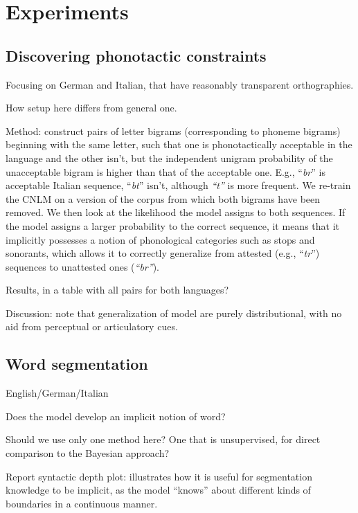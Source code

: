 \section{Experiments}
\label{sec:experiments}

\subsection{Discovering phonotactic constraints}
\label{sec:phonotactics}

Focusing on German and Italian, that have reasonably transparent
orthographies.

How setup here differs from general one.

Method: construct pairs of letter bigrams (corresponding to phoneme
bigrams) beginning with the same letter, such that one is
phonotactically acceptable in the language and the other isn't, but
the independent unigram probability of the unacceptable bigram is
higher than that of the acceptable one. E.g., ``\emph{br}'' is
acceptable Italian sequence, ``\emph{bt}'' isn't, although
\emph{``t''} is more frequent. We re-train the CNLM on a version of
the corpus from which both bigrams have been removed. We then look at
the likelihood the model assigns to both sequences. If the model
assigns a larger probability to the correct sequence, it means that it
implicitly possesses a notion of phonological categories such as
stops and sonorants, which allows it to correctly generalize from
attested (e.g., ``\emph{tr}'') sequences to unattested ones
(\emph{``br''}).

Results, in a table with all pairs for both languages?

Discussion: note that generalization of model are purely
distributional, with no aid from perceptual or articulatory cues.

\subsection{Word segmentation}
\label{sec:segmentation}

English/German/Italian

Does the model develop an implicit notion of word?

Should we use only one method here? One that is unsupervised, for
direct comparison to the Bayesian approach?

Report syntactic depth plot: illustrates how it is useful for
segmentation knowledge to be implicit, as the model ``knows'' about
different kinds of boundaries in a continuous manner.

